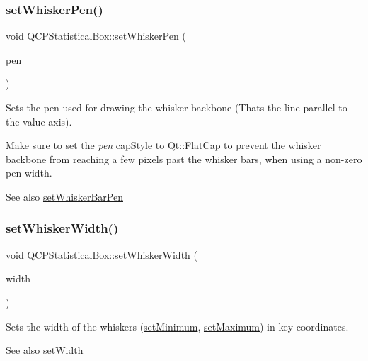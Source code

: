 \subsubsection{\texorpdfstring{set\+Whisker\+Pen()}{setWhiskerPen()}}
{\footnotesize\ttfamily void Q\+C\+P\+Statistical\+Box\+::set\+Whisker\+Pen (\begin{DoxyParamCaption}\item[{const Q\+Pen \&}]{pen }\end{DoxyParamCaption})}

Sets the pen used for drawing the whisker backbone (That\textquotesingle{}s the line parallel to the value axis).

Make sure to set the {\itshape pen} cap\+Style to Qt\+::\+Flat\+Cap to prevent the whisker backbone from reaching a few pixels past the whisker bars, when using a non-\/zero pen width.

\begin{DoxySeeAlso}{See also}
\mbox{\hyperlink{class_q_c_p_statistical_box_aa8d3e503897788e1abf68dc74b5f147f}{set\+Whisker\+Bar\+Pen}} 
\end{DoxySeeAlso}
\mbox{\label{class_q_c_p_statistical_box_adf378812446bd66f34d1f7f293d991cd}} 
\subsubsection{\texorpdfstring{set\+Whisker\+Width()}{setWhiskerWidth()}}
{\footnotesize\ttfamily void Q\+C\+P\+Statistical\+Box\+::set\+Whisker\+Width (\begin{DoxyParamCaption}\item[{double}]{width }\end{DoxyParamCaption})}

Sets the width of the whiskers (\mbox{\hyperlink{class_q_c_p_statistical_box_a84ff7cc61ba44890f0c3e0c99c19941e}{set\+Minimum}}, \mbox{\hyperlink{class_q_c_p_statistical_box_acec5ad1901f00f2c5387cfb4d9787eb3}{set\+Maximum}}) in key coordinates.

\begin{DoxySeeAlso}{See also}
\mbox{\hyperlink{class_q_c_p_statistical_box_a0b62775bd67301b1eba5c785f2b26f14}{set\+Width}} 
\end{DoxySeeAlso}
\mbox{\label{class_q_c_p_statistical_box_a0b62775bd67301b1eba5c785f2b26f14}} 
